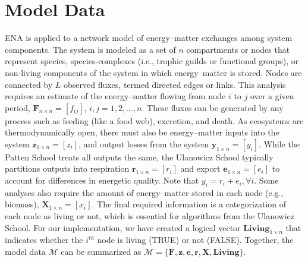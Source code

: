 \documentclass[article]{jss}
\begin{document}

\section{Model Data}

ENA is applied to a network model of energy--matter exchanges among
system components.  The system is modeled as a set of $n$ compartments
or nodes that represent species, species-complexes (i.e., trophic
guilds or functional groups), or non-living components of the system
in which energy--matter is stored.  Nodes are connected by $L$
observed fluxes, termed directed edges or links.  This analysis
requires an estimate of the energy--matter flowing from node $i$ to
$j$ over a given period, $\mathbf{F}_{n\times n}=[f_{ij}]$,
$i,j=1,2,\ldots,n$.  These fluxes can be generated by any process such
as feeding (like a food web), excretion, and death.  As ecosystems are
thermodynamically open, there must also be energy--matter inputs into
the system $\mathbf{z}_{1 \times n}=[z_i]$, and output losses from the
system $\mathbf{y}_{1 \times n}=[y_i]$.  While the Patten School treats
all outputs the same, the Ulanowicz School typically partitions
outputs into respiration $\mathbf{r}_{1\times n}=[r_i]$ and export
$\mathbf{e}_{1\times n}=[e_i]$ to account for differences in energetic
quality. Note that $y_i = r_i + e_i, \forall i$.  Some analyses
also require the amount of energy--matter stored in each node (e.g.,
biomass), $\mathbf{X}_{1\times n}=[x_i]$.  The final required
information is a categorization of each node as living or not, which
is essential for algorithms from the Ulanowicz School.  For
our implementation, we have created a logical vector $\mathbf{Living}_{1 \times
  n}$ that indicates whether the $i^{th}$ node is living (TRUE)
or not (FALSE).  Together, the model data $\mathcal{M}$ can be
summarized as $\mathcal{M} =
\{\mathbf{F}, \mathbf{z}, \mathbf{e}, \mathbf{r}, \mathbf{X}, \mathbf{Living}\}$.
\end{document}
